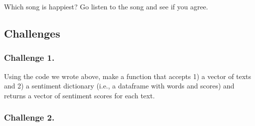 \documentclass[
]{book}
\newenvironment{Shaded}{\begin{snugshade}}{\end{snugshade}}
\newcommand{\CommentTok}[1]{\textcolor[rgb]{0.56,0.35,0.01}{\textit{#1}}}
\newcommand{\ControlFlowTok}[1]{\textcolor[rgb]{0.13,0.29,0.53}{\textbf{#1}}}
\newcommand{\KeywordTok}[1]{\textcolor[rgb]{0.13,0.29,0.53}{\textbf{#1}}}
\newcommand{\NormalTok}[1]{#1}
\newcommand{\OperatorTok}[1]{\textcolor[rgb]{0.81,0.36,0.00}{\textbf{#1}}}
\newcommand{\StringTok}[1]{\textcolor[rgb]{0.31,0.60,0.02}{#1}}
\begin{document}
\begin{Shaded}
\end{Shaded}

Which song is happiest? Go listen to the song and see if you agree.

\hypertarget{challenges-19}{%
\subsection{Challenges}\label{challenges-19}}

\hypertarget{challenge-1.-17}{%
\subsubsection*{Challenge 1.}\label{challenge-1.-17}}

Using the code we wrote above, make a function that accepts 1) a vector of texts and 2) a sentiment dictionary (i.e., a dataframe with words and scores) and returns a vector of sentiment scores for each text.

\begin{Shaded}
\end{Shaded}

\hypertarget{challenge-2.-16}{%
\subsubsection*{Challenge 2.}\label{challenge-2.-16}}
\end{document}
